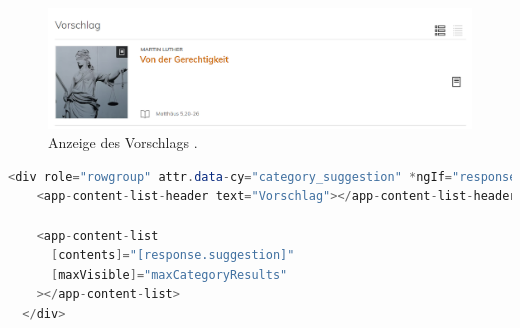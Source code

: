 \begin{figure}[h]
  \begin{centering}
    \includegraphics[width=\textwidth]{figures/development/suggestion.png}
    \caption{Anzeige des Vorschlags \cite{pfleiderer2022}.}
    \label{fig:suggestion}
  \end{centering}
\end{figure}


\begin{lstlisting}[language=Java, label={code:suggestionRow}, title={Code für Anzeige des Vorschlage \cite{frontend2022}}]
  <div role="rowgroup" attr.data-cy="category_suggestion" *ngIf="response.suggestion>
    <app-content-list-header text="Vorschlag"></app-content-list-header>

    <app-content-list
      [contents]="[response.suggestion]"
      [maxVisible]="maxCategoryResults"
    ></app-content-list>
  </div>
\end{lstlisting}
